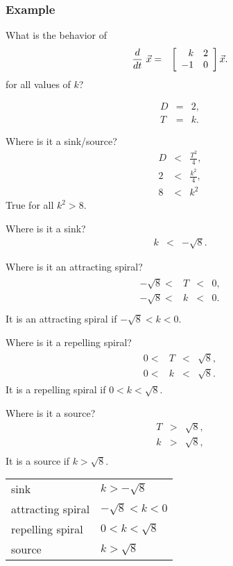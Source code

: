 \begin{frame}
  \frametitle{Example}

  What is the behavior of
  \begin{eqnarray*}
    \deriv{~}{t} \vec{x} & = & \arrayTwo{k}{2}{-1}{0} \vec{x}.
  \end{eqnarray*}
  for all values of $k$?


  {
    \begin{eqnarray*}
      D & = & 2, \\
      T & = & k.
    \end{eqnarray*}
  }



  {
    Where is it a sink/source?
    \begin{eqnarray*}
      D & < & \frac{T^2}{4}, \\
      2 & < & \frac{k^2}{4}, \\
      8 & < & k^2
    \end{eqnarray*}
    True for all $k^2>8$.
  }


  {
    Where is it a sink?
    \begin{eqnarray*}
      k & < & -\sqrt{8}.
    \end{eqnarray*}
  }

  {
    Where is it an attracting spiral?
    \begin{eqnarray*}
      \begin{array}{rcccl}
        -\sqrt{8} < & T & < & 0, \\
        -\sqrt{8} < & k & < & 0. \\
      \end{array}
    \end{eqnarray*}
    It is an attracting spiral if $-\sqrt{8}<k<0$.
  }

  {
    Where is it a repelling spiral?
    \begin{eqnarray*}
      \begin{array}{rcccl}
        0 < & T & < & \sqrt{8}, \\
        0 < & k & < & \sqrt{8}.
      \end{array}
    \end{eqnarray*}
    It is a repelling spiral if $0<k<\sqrt{8}$.
  }

  {
    Where is it a source?
    \begin{eqnarray*}
        T & > & \sqrt{8}, \\
        k & > & \sqrt{8}, \\
    \end{eqnarray*}
    It is a  source if $k>\sqrt{8}$.
  }


  {
    \begin{tabular}{ll}
      sink              & $k>-\sqrt{8}$\\
      attracting spiral & $-\sqrt{8} < k < 0$ \\
      repelling  spiral & $0 < k < \sqrt{8}$ \\
      source            & $k>\sqrt{8}$
    \end{tabular}
  }



\end{frame}




